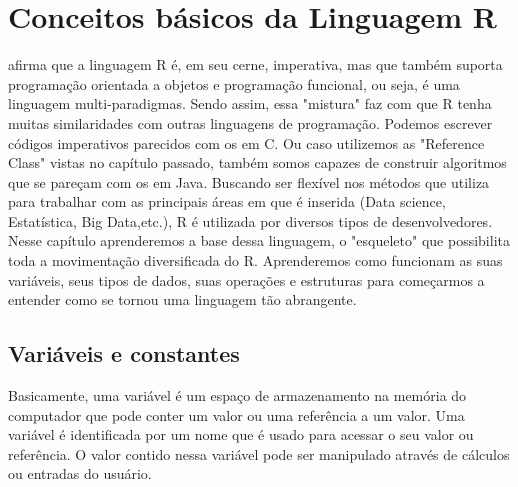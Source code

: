 %


\chapter{ Conceitos b\'{a}sicos da Linguagem R}






\cite{Cotton2013} afirma que a linguagem R é, em seu cerne, imperativa, mas que também suporta programação orientada a objetos e programação funcional, ou seja, é uma linguagem multi-paradigmas. Sendo assim, essa "mistura" faz com que R tenha muitas similaridades com outras linguagens de programação. Podemos escrever códigos imperativos parecidos com os em C. Ou caso utilizemos as "Reference Class" vistas no capítulo passado, também somos capazes de construir algoritmos que se pareçam com os em Java. Buscando ser flexível nos métodos que utiliza para trabalhar com as principais áreas em que é inserida (Data science, Estatística, Big Data,etc.), R é utilizada por diversos tipos de desenvolvedores. Nesse capítulo aprenderemos a base dessa linguagem, o "esqueleto" que possibilita toda a movimentação diversificada do R. Aprenderemos como funcionam as suas variáveis, seus tipos de dados, suas operações e estruturas para começarmos a entender como se tornou uma linguagem tão abrangente.


    \section{Vari\'{a}veis e constantes}
	Basicamente, uma variável é um espaço de armazenamento na memória do computador que pode conter um valor ou uma referência a um valor. Uma variável é identificada por um nome que é usado para acessar o seu valor ou referência. O valor contido nessa variável pode ser manipulado através de cálculos ou entradas do usuário.
	
